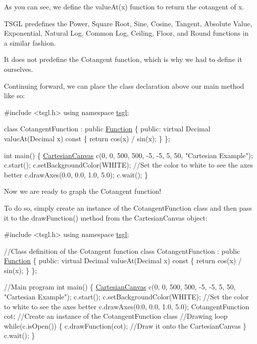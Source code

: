 As you can see, we define the value\+At(x) function to return the cotangent of x.

T\+S\+G\+L predefines the Power, Square Root, Sine, Cosine, Tangent, Absolute Value, Exponential, Natural Log, Common Log, Ceiling, Floor, and Round functions in a similar fashion.

It does not predefine the Cotangent function, which is why we had to define it ourselves.

Continuing forward, we can place the class declaration above our main method like so\+:


\begin{DoxyCode}
\textcolor{preprocessor}{#include <tsgl.h>}
\textcolor{keyword}{using namespace }\hyperlink{namespacetsgl}{tsgl};

\textcolor{keyword}{class }CotangentFunction : \textcolor{keyword}{public} \hyperlink{classtsgl_1_1_function}{Function} \{
 \textcolor{keyword}{public}:
    \textcolor{keyword}{virtual} Decimal valueAt(Decimal x)\textcolor{keyword}{ const }\{
      \textcolor{keywordflow}{return} cos(x) / sin(x);
    \}
\};

\textcolor{keywordtype}{int} main() \{
  \hyperlink{classtsgl_1_1_cartesian_canvas}{CartesianCanvas} c(0, 0, 500, 500, -5, -5, 5, 50, \textcolor{stringliteral}{"Cartesian Example"});
  c.start();
  c.setBackgroundColor(WHITE); \textcolor{comment}{//Set the color to white to see the axes better}
  c.drawAxes(0.0, 0.0, 1.0, 5.0);
  c.wait();
\}
\end{DoxyCode}


Now we are ready to graph the Cotangent function!

To do so, simply create an instance of the Cotangent\+Function class and then pass it to the draw\+Function() method from the Cartesian\+Canvas object\+:


\begin{DoxyCode}
\textcolor{preprocessor}{#include <tsgl.h>}
\textcolor{keyword}{using namespace }\hyperlink{namespacetsgl}{tsgl};

\textcolor{comment}{//Class definition of the Cotangent function}
\textcolor{keyword}{class }CotangentFunction : \textcolor{keyword}{public} \hyperlink{classtsgl_1_1_function}{Function} \{
 \textcolor{keyword}{public}:
    \textcolor{keyword}{virtual} Decimal valueAt(Decimal x)\textcolor{keyword}{ const }\{
      \textcolor{keywordflow}{return} cos(x) / sin(x);
    \}
\};

\textcolor{comment}{//Main program}
\textcolor{keywordtype}{int} main() \{
  \hyperlink{classtsgl_1_1_cartesian_canvas}{CartesianCanvas} c(0, 0, 500, 500, -5, -5, 5, 50, \textcolor{stringliteral}{"Cartesian Example"});
  c.start();
  c.setBackgroundColor(WHITE);  \textcolor{comment}{//Set the color to white to see the axes better}
  c.drawAxes(0.0, 0.0, 1.0, 5.0);
  CotangentFunction cot;  \textcolor{comment}{//Create an instance of the CotangentFunction class}
  \textcolor{comment}{//Drawing loop}
  \textcolor{keywordflow}{while}(c.isOpen()) \{
    c.drawFunction(cot); \textcolor{comment}{//Draw it onto the CartesianCanvas}
  \}
  c.wait();
\}
\end{DoxyCode}


